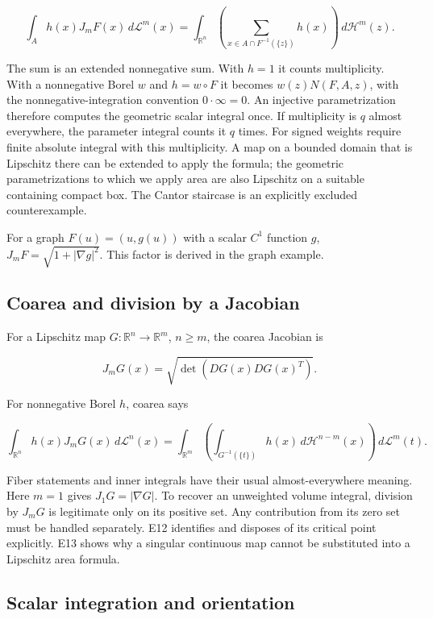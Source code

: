 \documentclass[
  11pt,
]{article}
\begin{document}
\[
\int_A h(x)J_mF(x)\,d\mathcal L^m(x)
=\int_{\mathbb R^n}\left(\sum_{x\in A\cap F^{-1}(\{z\})}h(x)\right)
\,d\mathcal H^m(z).
\]

The sum is an extended nonnegative sum. With \(h=1\) it counts
multiplicity. With a nonnegative Borel \(w\) and \(h=w\circ F\) it
becomes \(w(z)N(F,A,z)\), with the nonnegative-integration convention
\(0\cdot\infty=0\). An injective parametrization therefore computes the
geometric scalar integral once. If multiplicity is \(q\) almost
everywhere, the parameter integral counts it \(q\) times. For signed
weights require finite absolute integral with this multiplicity. A map
on a bounded domain that is Lipschitz there can be extended to apply the
formula; the geometric parametrizations to which we apply area are also
Lipschitz on a suitable containing compact box. The Cantor staircase is
an explicitly excluded counterexample.

For a graph \(F(u)=(u,g(u))\) with a scalar \(C^1\) function \(g\),
\(J_mF=\sqrt{1+|\nabla g|^2}\). This factor is derived in the graph
example.

\subsection{Coarea and division by a
Jacobian}\label{coarea-and-division-by-a-jacobian}

For a Lipschitz map \(G:\mathbb R^n\to\mathbb R^m\), \(n\geq m\), the
coarea Jacobian is

\[
J_mG(x)=\sqrt{\det(DG(x)DG(x)^T)}.
\]

For nonnegative Borel \(h\), coarea says

\[
\int_{\mathbb R^n}h(x)J_mG(x)\,d\mathcal L^n(x)
=\int_{\mathbb R^m}\left(\int_{G^{-1}(\{t\})}h(x)
\,d\mathcal H^{n-m}(x)\right)\,d\mathcal L^m(t).
\]

Fiber statements and inner integrals have their usual almost-everywhere
meaning. Here \(m=1\) gives \(J_1G=|\nabla G|\). To recover an
unweighted volume integral, division by \(J_mG\) is legitimate only on
its positive set. Any contribution from its zero set must be handled
separately. E12 identifies and disposes of its critical point
explicitly. E13 shows why a singular continuous map cannot be
substituted into a Lipschitz area formula.

\subsection{Scalar integration and
orientation}\label{scalar-integration-and-orientation}
\end{document}
